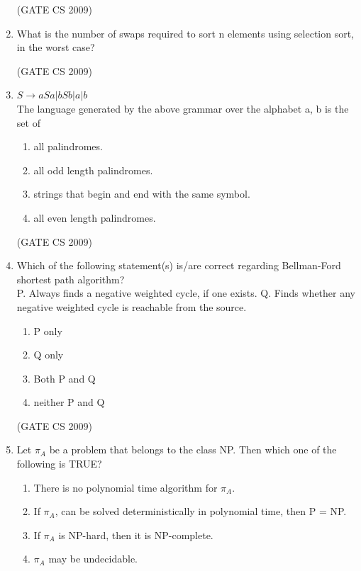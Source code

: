 \documentclass[a4paper, 11pt]{article}
\begin{document}
\begin{enumerate}
    \hfill (GATE CS 2009)

    \item What is the number of swaps required to sort n elements using selection sort, in the worst case?\\
    \begin{enumerate}
    \end{enumerate}

    \hfill (GATE CS 2009)

    \item $S \rightarrow aSa | bSb| a | b$\\The language generated by the above grammar over the alphabet {a, b} is the set of
    \begin{enumerate} 
        \item all palindromes.
        \item all odd length palindromes.
        \item strings that begin and end with the same symbol.
        \item all even length palindromes.
    \end{enumerate}

    \hfill (GATE CS 2009)

    \item Which of the following statement(s) is/are correct regarding Bellman-Ford shortest path algorithm?\\
    P. Always finds a negative weighted cycle, if one exists.
    Q. Finds whether any negative weighted cycle is reachable from the source.
    \begin{enumerate} 
        \item P only
        \item Q only
        \item Both P and Q
        \item neither P and Q
    \end{enumerate}

    \hfill (GATE CS 2009)

    \item Let $\pi_A$ be a problem that belongs to the class NP. Then which one of the following is TRUE?\\
    \begin{enumerate}
        \item There is no polynomial time algorithm for $\pi_A$.
        \item If $\pi_A$, can be solved deterministically in polynomial time, then P = NP.
        \item If $\pi_A$ is NP-hard, then it is NP-complete.
        \item $\pi_A$ may be undecidable.
    \end{enumerate}


\end{enumerate}
\end{document}
